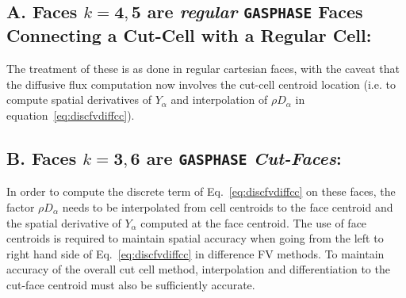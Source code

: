 \subsection*{A. Faces $k=\mathbf{4},\mathbf{5}$ are \textit{regular} \texttt{GASPHASE} Faces Connecting a Cut-Cell with a Regular Cell:}
The treatment of these is as done in regular cartesian faces, with the caveat that the diffusive flux computation now involves the cut-cell centroid location (i.e. to compute spatial derivatives of $Y_\alpha$ and interpolation of $\rho D_\alpha$ in equation~\eqref{eq:discfvdiffcc}).

\subsection*{B. Faces $k=\mathbf{3},\mathbf{6}$ are \texttt{GASPHASE} \textit{Cut-Faces}:}

In order to compute the discrete term of Eq.~\eqref{eq:discfvdiffcc} on these faces, the factor $\rho D_\alpha$ needs to be interpolated from cell centroids to the face centroid and the spatial derivative of $Y_\alpha$ computed at the face centroid. The use of face centroids is required to maintain spatial accuracy when going from the left to right hand side of Eq.~\eqref{eq:discfvdiffcc} in difference FV methods. To maintain accuracy of the overall cut cell method, interpolation and differentiation to the cut-face centroid must also be sufficiently accurate.

